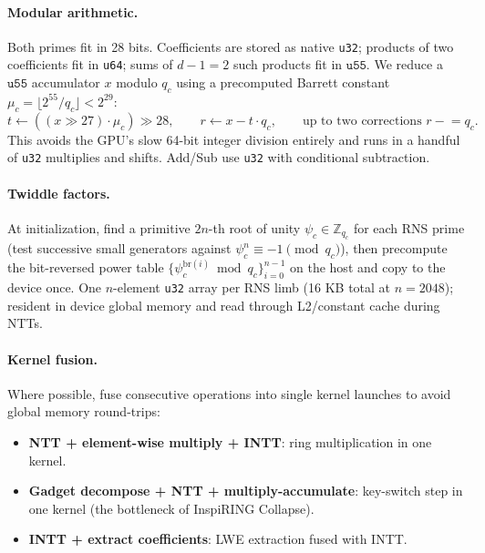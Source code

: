 \documentclass[11pt,a4paper]{article}
\newcommand{\Z}{\mathbb{Z}}
\begin{document}
\paragraph{Modular arithmetic.}
Both primes fit in 28 bits.
Coefficients are stored as native \texttt{u32}; products of two coefficients fit in \texttt{u64}; sums of $d{-}1 = 2$ such products fit in $\texttt{u55}$.
We reduce a $\texttt{u55}$ accumulator $x$ modulo $q_c$ using a precomputed Barrett constant $\mu_c = \lfloor 2^{55} / q_c \rfloor < 2^{29}$:
\[
t \gets ((x \gg 27) \cdot \mu_c) \gg 28, \qquad r \gets x - t \cdot q_c, \qquad \text{up to two corrections } r \mathrel{-}= q_c.
\]
This avoids the GPU's slow 64-bit integer division entirely and runs in a handful of \texttt{u32} multiplies and shifts.
Add/Sub use \texttt{u32} with conditional subtraction.

\paragraph{Twiddle factors.}
At initialization, find a primitive $2n$-th root of unity $\psi_c \in \Z_{q_c}$ for each RNS prime (test successive small generators against $\psi_c^n \equiv -1 \pmod{q_c}$), then precompute the bit-reversed power table $\{\psi_c^{\mathrm{br}(i)} \bmod q_c\}_{i=0}^{n-1}$ on the host and copy to the device once.
One $n$-element \texttt{u32} array per RNS limb (16 KB total at $n = 2048$); resident in device global memory and read through L2/constant cache during NTTs.

\paragraph{Kernel fusion.}
Where possible, fuse consecutive operations into single kernel launches to avoid global memory round-trips:
\begin{itemize}[nosep]
    \item \textbf{NTT + element-wise multiply + INTT}: ring multiplication in one kernel.
    \item \textbf{Gadget decompose + NTT + multiply-accumulate}: key-switch step in one kernel (the bottleneck of InspiRING Collapse).
    \item \textbf{INTT + extract coefficients}: LWE extraction fused with INTT.
\end{itemize}
\end{document}
